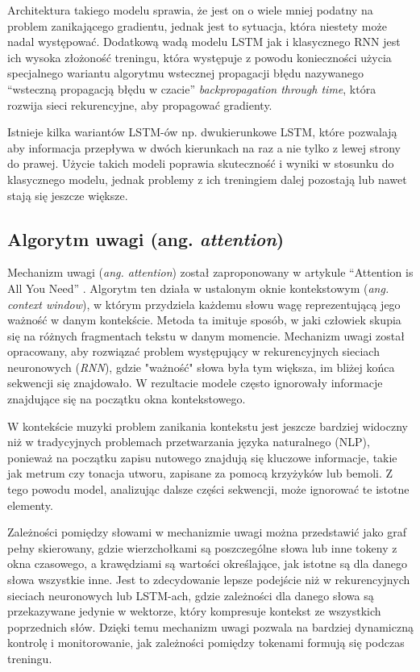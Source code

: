 \documentclass[data-science]{agh-wi} %
\begin{document}
Architektura takiego modelu sprawia, że jest on o wiele mniej podatny na problem zanikającego gradientu, jednak jest to sytuacja, która niestety może nadal występować. Dodatkową wadą modelu LSTM jak i klasycznego RNN jest ich wysoka złożoność treningu, która występuje z powodu konieczności użycia specjalnego wariantu algorytmu wstecznej propagacji błędu nazywanego ``wsteczną propagacją błędu w czacie'' \textit{backpropagation through time}, która rozwija sieci rekurencyjne, aby propagować gradienty.

Istnieje kilka wariantów LSTM-ów np. dwukierunkowe LSTM, które pozwalają aby informacja przepływa w dwóch kierunkach na raz a nie tylko z lewej strony do prawej. Użycie takich modeli poprawia skuteczność i wyniki w stosunku do klasycznego modelu, jednak problemy z ich treningiem dalej pozostają lub nawet stają się jeszcze większe.

\subsection{Algorytm uwagi (ang. \textit{attention})}
\label{sec:attention}
Mechanizm uwagi (\textit{ang. attention}) został zaproponowany w artykule ``Attention is All You Need'' \cite{attention}. Algorytm ten działa w ustalonym oknie kontekstowym (\textit{ang. context window}), w którym przydziela każdemu słowu wagę reprezentującą jego ważność w danym kontekście. Metoda ta imituje sposób, w jaki człowiek skupia się na różnych fragmentach tekstu w danym momencie. Mechanizm uwagi został opracowany, aby rozwiązać problem występujący w rekurencyjnych sieciach neuronowych (\textit{RNN}), gdzie "ważność" słowa była tym większa, im bliżej końca sekwencji się znajdowało. W rezultacie modele często ignorowały informacje znajdujące się na początku okna kontekstowego.

W kontekście muzyki problem zanikania kontekstu jest jeszcze bardziej widoczny niż w tradycyjnych problemach przetwarzania języka naturalnego (NLP), ponieważ na początku zapisu nutowego znajdują się kluczowe informacje, takie jak metrum czy tonacja utworu, zapisane za pomocą krzyżyków lub bemoli. Z tego powodu model, analizując dalsze części sekwencji, może ignorować te istotne elementy.

Zależności pomiędzy słowami w mechanizmie uwagi można przedstawić jako graf pełny skierowany, gdzie wierzchołkami są poszczególne słowa lub inne tokeny z okna czasowego, a krawędziami są wartości określające, jak istotne są dla danego słowa wszystkie inne. Jest to zdecydowanie lepsze podejście niż w rekurencyjnych sieciach neuronowych lub LSTM-ach, gdzie zależności dla danego słowa są przekazywane jedynie w wektorze, który kompresuje kontekst ze wszystkich poprzednich słów. Dzięki temu mechanizm uwagi pozwala na bardziej dynamiczną kontrolę i monitorowanie, jak zależności pomiędzy tokenami formują się podczas treningu.
\end{document}

